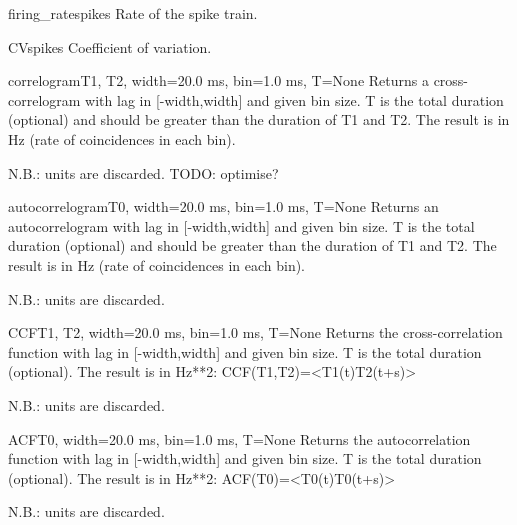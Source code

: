 \documentclass[letterpaper,10pt,english]{manual}
\begin{document}
\hypertarget{brian.firing_rate}{}\begin{funcdesc}{firing\_rate}{spikes}
Rate of the spike train.
\end{funcdesc}

\hypertarget{brian.CV}{}\begin{funcdesc}{CV}{spikes}
Coefficient of variation.
\end{funcdesc}

\hypertarget{brian.correlogram}{}\begin{funcdesc}{correlogram}{T1, T2, width=20.0 ms, bin=1.0 ms, T=None}
Returns a cross-correlogram with lag in {[}-width,width{]} and given bin size.
T is the total duration (optional) and should be greater than the duration of T1 and T2.
The result is in Hz (rate of coincidences in each bin).

N.B.: units are discarded.
TODO: optimise?
\end{funcdesc}

\hypertarget{brian.autocorrelogram}{}\begin{funcdesc}{autocorrelogram}{T0, width=20.0 ms, bin=1.0 ms, T=None}
Returns an autocorrelogram with lag in {[}-width,width{]} and given bin size.
T is the total duration (optional) and should be greater than the duration of T1 and T2.
The result is in Hz (rate of coincidences in each bin).

N.B.: units are discarded.
\end{funcdesc}

\hypertarget{brian.CCF}{}\begin{funcdesc}{CCF}{T1, T2, width=20.0 ms, bin=1.0 ms, T=None}
Returns the cross-correlation function with lag in {[}-width,width{]} and given bin size.
T is the total duration (optional).
The result is in Hz**2:
CCF(T1,T2)=\textless{}T1(t)T2(t+s)\textgreater{}

N.B.: units are discarded.
\end{funcdesc}

\hypertarget{brian.ACF}{}\begin{funcdesc}{ACF}{T0, width=20.0 ms, bin=1.0 ms, T=None}
Returns the autocorrelation function with lag in {[}-width,width{]} and given bin size.
T is the total duration (optional).
The result is in Hz**2:
ACF(T0)=\textless{}T0(t)T0(t+s)\textgreater{}

N.B.: units are discarded.
\end{funcdesc}
\end{document}
